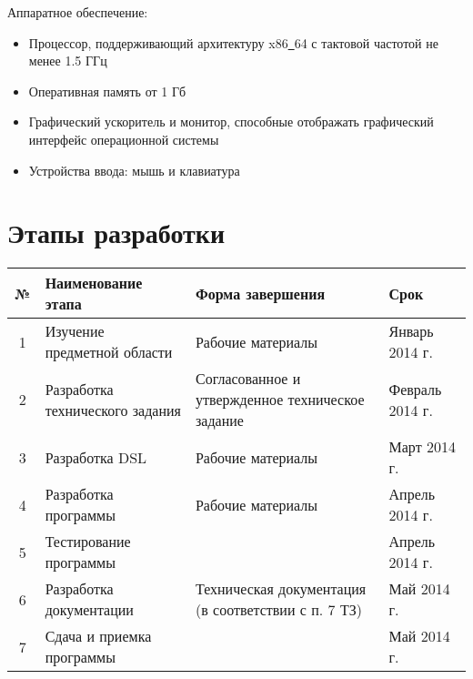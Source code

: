 \documentclass[russian,utf8,emptystyle]{eskdtext}
\begin{document}
Аппаратное обеспечение:
\begin{itemize}
\item Процессор, поддерживающий архитектуру x86\underline{~}64 с тактовой частотой не менее 1.5 ГГц
\item Оперативная память от 1 Гб
\item Графический ускоритель и монитор, способные отображать графический интерфейс операционной системы
\item Устройства ввода: мышь и клавиатура
\end{itemize}

\section{Этапы разработки}
\begin{center}
\begin{tabularx}{\textwidth}{c|X|X|X}
№ & Наименование этапа & Форма завершения & Срок \\ 
\hline 
1 & Изучение предметной области & Рабочие материалы & Январь 2014 г. \\ 
\hline 
2 & Разработка технического задания & Согласованное и утвержденное техническое задание & Февраль 2014 г. \\ 
\hline 
3 & Разработка DSL & Рабочие материалы & Март 2014 г. \\ 
\hline 
4 & Разработка программы & Рабочие материалы & Апрель 2014 г. \\ 
\hline 
5 & Тестирование программы &   & Апрель 2014 г. \\ 
\hline 
6 & Разработка документации & Техническая документация (в соответствии с п. 7 ТЗ) & Май 2014 г. \\ 
\hline 
7 & Сдача и приемка программы &   & Май 2014 г. \\
\end{tabularx} 
\end{center}
\end{document}
